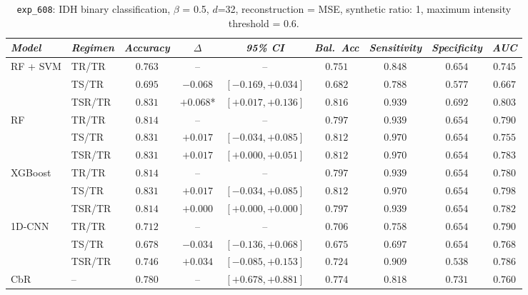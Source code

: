 \begin{table}[H]
\centering
\scriptsize
\label{tab:ctrl_exp_608}
\begin{tabular*}{\textwidth}{@{\extracolsep{\fill}}llccccccc}
\toprule
\emph{Model} & \emph{Regimen} & \emph{Accuracy} & \emph{$\Delta$} & \emph{95\% CI} & \emph{Bal.\ Acc} & \emph{Sensitivity} & \emph{Specificity} & \emph{AUC}\\
\midrule
\multirow{3}{*}{RF + SVM} & TR/TR & $0.763$ & -- & -- & $0.751$ & $0.848$ & $0.654$ & $0.745$\\
 & TS/TR & $0.695$ & $-0.068$ & $[-0.169, +0.034]$ & $0.682$ & $0.788$ & $0.577$ & $0.667$\\
 & TSR/TR & $0.831$ & $+0.068$* & $[+0.017, +0.136]$ & $0.816$ & $0.939$ & $0.692$ & $0.803$\\
\midrule
\multirow{3}{*}{RF} & TR/TR & $0.814$ & -- & -- & $0.797$ & $0.939$ & $0.654$ & $0.790$\\
 & TS/TR & $0.831$ & $+0.017$ & $[-0.034, +0.085]$ & $0.812$ & $0.970$ & $0.654$ & $0.755$\\
 & TSR/TR & $0.831$ & $+0.017$ & $[+0.000, +0.051]$ & $0.812$ & $0.970$ & $0.654$ & $0.783$\\
\midrule
\multirow{3}{*}{XGBoost} & TR/TR & $0.814$ & -- & -- & $0.797$ & $0.939$ & $0.654$ & $0.780$\\
 & TS/TR & $0.831$ & $+0.017$ & $[-0.034, +0.085]$ & $0.812$ & $0.970$ & $0.654$ & $0.798$\\
 & TSR/TR & $0.814$ & $+0.000$ & $[+0.000, +0.000]$ & $0.797$ & $0.939$ & $0.654$ & $0.782$\\
\midrule
\multirow{3}{*}{1D-CNN} & TR/TR & $0.712$ & -- & -- & $0.706$ & $0.758$ & $0.654$ & $0.790$\\
 & TS/TR & $0.678$ & $-0.034$ & $[-0.136, +0.068]$ & $0.675$ & $0.697$ & $0.654$ & $0.768$\\
 & TSR/TR & $0.746$ & $+0.034$ & $[-0.085, +0.153]$ & $0.724$ & $0.909$ & $0.538$ & $0.786$\\
\midrule
CbR & -- & $0.780$ & -- & $[+0.678, +0.881]$ & $0.774$ & $0.818$ & $0.731$ & $0.760$\\
\bottomrule
\end{tabular*}
\caption{\small \texttt{exp\_608}: IDH binary classification, $\beta$ = 0.5, $d$=32, reconstruction = MSE, synthetic ratio: 1, maximum intensity threshold = 0.6.}
\end{table}


